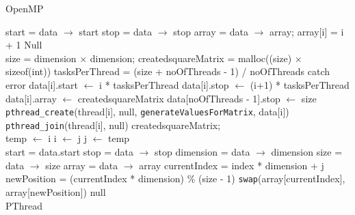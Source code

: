 \documentclass[10pt,twocolumn]{witseiepaper}
\begin{document}
\begin{appendix}
\begin{algorithm}[htbp]
\begin{algorithmic}
		\caption{OpenMP}
		\label{alg:1}
	\end{algorithmic}
\end{algorithm}

\begin{algorithm}[htbp]
	\begin{algorithmic}
		\State start = data $\rightarrow$ start
		\State stop = data $\rightarrow$ stop
		\State array = data $\rightarrow$ array;
		\State array[i] = i + 1
		\EndFor
		\State \Return Null
		\EndFunction \\
		
		\State size = dimension $\times$ dimension;
		\State created\textunderscore squareMatrix = malloc((size) $\times$ sizeof(int))
		\State tasksPerThread = (size + noOfThreads - 1) / noOfThreads
		\State catch error
		\EndIf
		\State data[i].start $\leftarrow$ i * tasksPerThread
		\State data[i].stop $\leftarrow$ (i+1) * tasksPerThread
		\State data[i].array $\leftarrow$ created\textunderscore squareMatrix
		\EndFor
		\State data[noOfThreads - 1].stop $\leftarrow$ size
		\State  \verb|pthread_create|(thread[i], null, \verb|generateValuesForMatrix|, data[i])
		\EndFor
		\State  \verb|pthread_join|(thread[i], null)
		\EndFor
		\EndFunction
		\State \Return created\textunderscore squareMatrix; \\
		
		\State temp $\leftarrow$ i
		\State i $\leftarrow$ j
		\State j $\leftarrow$ temp
		\EndFunction \\
		
		\State start = data.start
		\State stop = data $\rightarrow$ stop
		\State dimension = data $\rightarrow$ dimension
		\State size = data $\rightarrow$ size
		\State array = data $\rightarrow$ array
		\State currentIndex = index * dimension + j
		\State newPosition = (currentIndex * dimension) \% (size - 1)
		\State \verb|swap|(array[currentIndex], array[newPosition])
		\EndFor
		\EndFor
		\State \Return null
		\EndFunction \\
		
		\caption{PThread}
		\label{alg:3}
	\end{algorithmic}
\end{algorithm}


\end{appendix}
\end{document}
